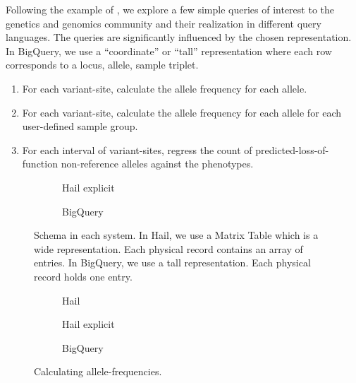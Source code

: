 \documentclass[sigconf, nonacm]{acmart}
\begin{document}
Following the example of \cite{evaluating-query-languages-and-systems-for-hep}, we explore a few
simple queries of interest to the genetics and genomics community and their realization in different
query languages. The queries are significantly influenced by the chosen representation. In BigQuery,
we use a ``coordinate'' or ``tall'' representation where each row corresponds to a locus, allele,
sample triplet.

\begin{enumerate}
\item For each variant-site, calculate the allele frequency for each allele.
\item For each variant-site, calculate the allele frequency for each allele for each user-defined
  sample group.
\item For each interval of variant-sites, regress the count of predicted-loss-of-function
  non-reference alleles against the phenotypes.
\end{enumerate}

\begin{figure}[h]
  \begin{subfigure}{0.5\textwidth}
    
    \caption{Hail explicit}
    \label{fig:query-example-schema-hail}
  \end{subfigure}

  \begin{subfigure}{0.5\textwidth}
    
    \caption{BigQuery}
    \label{fig:query-example-schema-bigquery}
  \end{subfigure}
  \caption{Schema in each system. In Hail, we use a Matrix Table which is a wide
    representation. Each physical record contains an array of entries. In BigQuery, we use a tall
    representation. Each physical record holds one entry.}
  \label{fig:query-example-schema}
\end{figure}

\begin{figure}[h]
  \begin{subfigure}{0.5\textwidth}
    
    \caption{Hail}
    \label{fig:query-example-one-hail-builtin}
  \end{subfigure}

  \begin{subfigure}{0.5\textwidth}
    
    \caption{Hail explicit}
    \label{fig:query-example-one-hail}
  \end{subfigure}

  \begin{subfigure}{0.5\textwidth}
    
    \caption{BigQuery}
    \label{fig:query-example-one-bigquery}
  \end{subfigure}
  \caption{Calculating allele-frequencies.}
  \label{fig:query-example-one}
\end{figure}
\end{document}
